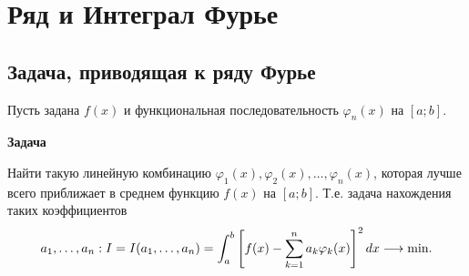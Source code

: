 \section{Ряд и Интеграл Фурье}

\subsection{Задача, приводящая к ряду Фурье}

Пусть задана $f(x)$ и функциональная последовательность ${\varphi_n(x)}$ на $[a ; b]$.

\textbf{Задача}

Найти такую линейную комбинацию $\varphi_1(x), \varphi_2(x),\dots, \varphi_n(x)$, 
которая лучше всего приближает в среднем функцию $f(x)$ на $[a ; b]$. Т.е. задача 
нахождения таких коэффициентов \[ a_1,\dots,a_n : I = I(a_1,\dots,a_n) = \displaystyle\int_a^b \left[ f(x) 
- \displaystyle\sum_{k=1}^n a_k\varphi_k(x)\right] ^2 dx \underset{}{\longrightarrow} \text{min.} \]


